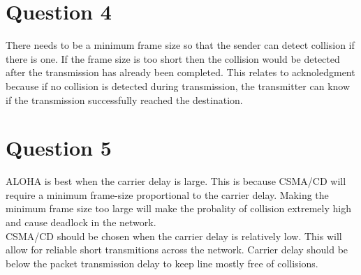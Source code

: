 \documentclass[12pt,letterpaper]{article}
\begin{document}
\section*{Question 4}
There needs to be a minimum frame size so that the sender can detect collision if
there is one. If the frame size is too short then the collision would be detected
after the transmission has already been completed. This relates to acknoledgment
because if no collision is detected during transmission, the transmitter can
know if the transmission successfully reached the destination.

\section*{Question 5}
ALOHA is best when the carrier delay is large. This is because CSMA/CD will require a
minimum frame-size proportional to the carrier delay. Making the minimum frame size
too large will make the probality of collision extremely high and cause deadlock in
the network.\\

CSMA/CD should be chosen when the carrier delay is relatively low. This will allow
for reliable short transmitions across the network. Carrier delay should be below
the packet transmission delay to keep line mostly free of collisions.
\end{document}
